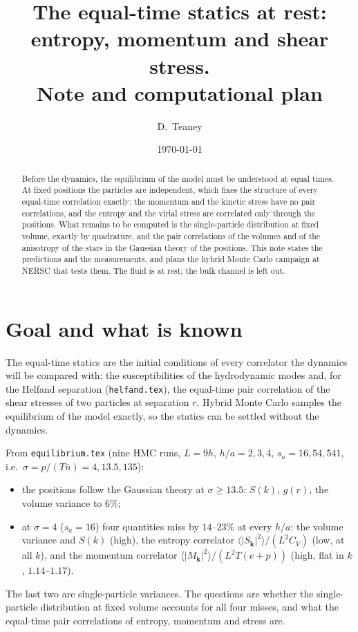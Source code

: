 \documentclass[11pt,aps,preprint,nofootinbib,superscriptaddress,tightenlines]{revtex4-2}
\newcommand{\avg}[1]{\langle #1\rangle}
\begin{document}
\title{The equal-time statics at rest: entropy, momentum and shear stress.\\ Note and computational plan}
\author{D.~Teaney}
\date{\today}

\begin{abstract}
Before the dynamics, the equilibrium of the model must be understood at equal times.  At fixed positions the particles are
independent, which fixes the structure of every equal-time correlation exactly: the momentum and the kinetic stress have no pair
correlations, and the entropy and the virial stress are correlated only through the positions.  What remains to be computed is the
single-particle distribution at fixed volume, exactly by quadrature, and the pair correlations of the volumes and of the anisotropy of the
stars in the Gaussian theory of the positions.  This note states the predictions and the measurements, and plans the hybrid Monte Carlo
campaign at NERSC that tests them.  The fluid is at rest; the bulk channel is left out.
\end{abstract}
\maketitle

\section{Goal and what is known}
\label{sec:goal}

The equal-time statics are the initial conditions of every correlator the dynamics will be compared with: the susceptibilities of the
hydrodynamic modes and, for the Helfand separation (\texttt{helfand.tex}), the equal-time pair correlation of the shear stresses of two
particles at separation $r$.  Hybrid Monte Carlo samples the equilibrium of the model exactly, so the statics can be settled without
the dynamics.

From \texttt{equilibrium.tex} (nine HMC runs, $L=9h$, $h/a=2,3,4$, $s_a=16,54,541$, i.e.\ $\sigma=p/(T\bar n)=4,13.5,135$):
\begin{itemize}
\item the positions follow the Gaussian theory at $\sigma\ge13.5$: $S(k)$, $g(r)$, the volume variance to $6\%$;
\item at $\sigma=4$ ($s_a=16$) four quantities miss by $14$--$23\%$ at every $h/a$: the volume variance and $S(k)$ (high), the entropy correlator
  $\avg{|S_{\bm k}|^2}/(L^2C_V)$ (low, at all $k$), and the momentum correlator $\avg{|M_{\bm k}|^2}/(L^2T(e+p))$ (high, flat in $k$, $1.14$--$1.17$).
\end{itemize}
The last two are single-particle variances.  The questions are whether the single-particle distribution at fixed volume accounts for all
four misses, and what the equal-time pair correlations of entropy, momentum and stress are.
\end{document}
